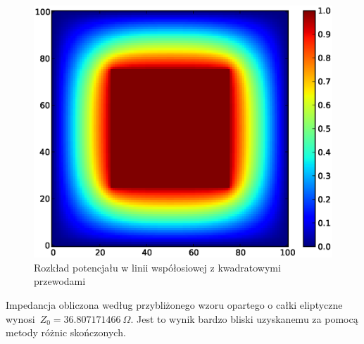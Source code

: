\documentclass[rep.tex]{subfiles}
\begin{document}
\begin{figure}[!htbp]
  \centering
  \includegraphics[scale=0.5]{fig/zad5/u}
  \caption{Rozkład potencjału w linii współosiowej z kwadratowymi przewodami}
  \label{fig:zad5:u}
\end{figure}

Impedancja obliczona według przybliżonego wzoru opartego o całki eliptyczne wynosi~$Z_0 = 36.807171466~\Omega$.
Jest to wynik bardzo bliski uzyskanemu za pomocą metody różnic skończonych.
\end{document}

